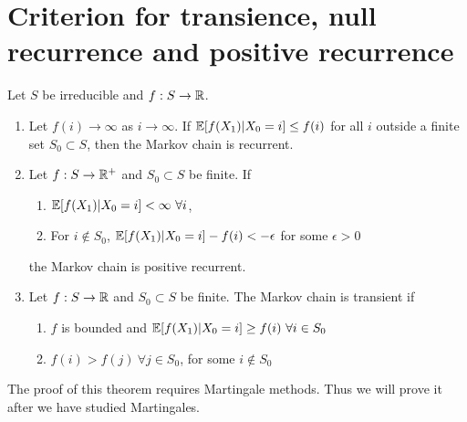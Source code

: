 \documentclass[all-lectures.tex]{subfiles}
\begin{document}

\setcounter{section}{3}
\setcounter{subsection}{0}

\section*{}
\section{Criterion for transience, null recurrence and positive recurrence}
\begin{thm} \label{prop:markov_chain_class_tests}
Let $S$ be irreducible and $f: S \rightarrow \mathbb{R}$. 
\begin{enumerate}
\item Let $f(i)\rightarrow \infty$ as $i\rightarrow \infty$. If $\mathbb{E}[f(X_1)|X_0 = i] \leq f(i)$ for all $i$ outside a finite set $S_0 \subset S$, then the Markov chain is recurrent. 
\item Let $f:S\rightarrow \mathbb{R}^+$ and $S_0 \subset S$ be finite. If 
	\begin{enumerate}
	\item  $\E[f(X_1)|X_0 = i] < \infty \ \forall i$,
	\item For $i \notin S_0$, $\mathbb{E}[f(X_1)|X_0 = i] - f(i) < -\epsilon$ for some $\epsilon > 0$
	\end{enumerate}
	 the Markov chain is positive recurrent. 
\item Let $f:S\rightarrow \mathbb{R}$ and $S_0 \subset S$ be finite.	The Markov chain is transient if
	\begin{enumerate}
	\item  $f$ is bounded and $\E[f(X_1)|X_0= i] \geq f(i)\ \forall i \in S_0$
	\item $f(i) > f(j)\ \forall j\in S_0$, for some $i\notin S_0$
	\end{enumerate}	
\end{enumerate}
\end{thm}
\indent The proof of this theorem requires Martingale methods. Thus we will prove it after we have studied Martingales. \\
\end{document}
